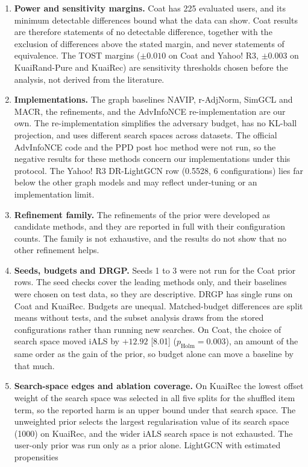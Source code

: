 \begin{enumerate}
\item \textbf{Power and sensitivity margins.} Coat has 225 evaluated users, and its minimum detectable differences bound
what the data can show. Coat results are therefore statements of no detectable difference, together with the exclusion
of differences above the stated margin, and never statements of equivalence. The TOST margins ($\pm0.010$ on Coat and
Yahoo! R3, $\pm0.003$ on KuaiRand-Pure and KuaiRec) are sensitivity thresholds chosen before the analysis, not derived
from the literature.
\item \textbf{Implementations.} The graph baselines NAVIP, r-AdjNorm, SimGCL and MACR, the refinements, and the AdvInfoNCE
re-implementation are our own. The re-implementation simplifies the adversary budget, has no KL-ball projection, and
uses different search spaces across datasets. The official AdvInfoNCE code and the PPD post hoc method were not run, so
the negative results for these methods concern our implementations under this protocol. The Yahoo! R3 DR-LightGCN row
(0.5528, 6 configurations) lies far below the other graph models and may reflect under-tuning or an implementation
limit.
\item \textbf{Refinement family.} The refinements of the prior were developed as candidate methods, and they are
reported in full with their configuration counts. The family is not exhaustive, and the results do not show that no
other refinement helps.
\item \textbf{Seeds, budgets and DRGP.} Seeds 1 to 3 were not run for the Coat prior rows. The seed checks cover the
leading methods only, and their baselines were chosen on test data, so they are descriptive. DRGP has single runs on
Coat and KuaiRec. Budgets are unequal. Matched-budget differences are split means without tests, and the subset
analysis draws from the stored configurations rather than running new searches. On Coat, the choice of search space
moved iALS by $+12.92$ [8.01] ($p_\mathrm{Holm}=0.003$), an amount of the same order as the gain of the prior, so budget
alone can move a baseline by that much.
\item \textbf{Search-space edges and ablation coverage.} On KuaiRec the lowest offset weight of the search space was
selected in all five splits for the shuffled item term, so the reported harm is an upper bound under that search space.
The unweighted prior selects the largest regularisation value of its search space (1000) on KuaiRec, and the wider iALS
search space is not exhausted. The user-only prior was run only as a prior alone. LightGCN with estimated propensities

\end{enumerate}
